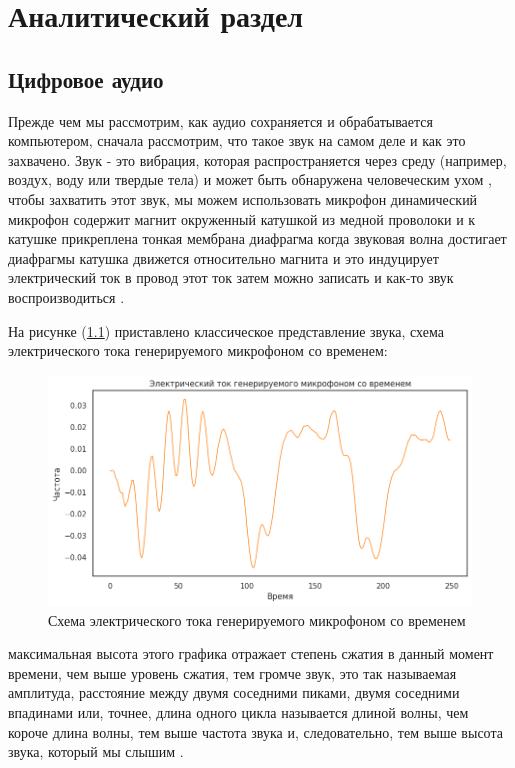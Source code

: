 \chapter{Аналитический раздел}
\section{Цифровое аудио}
Прежде чем мы рассмотрим, как аудио сохраняется и обрабатывается компьютером, сначала рассмотрим, что такое звук на самом деле и как это захвачено.
Звук - это вибрация, которая распространяется через среду (например, воздух, воду или твердые тела) и может быть обнаружена человеческим ухом \cite{pasnau1999sound}, чтобы захватить этот звук, мы можем использовать микрофон динамический микрофон содержит магнит окруженный катушкой из медной проволоки и к катушке прикреплена тонкая мембрана диафрагма когда звуковая волна достигает диафрагмы катушка движется относительно магнита и это индуцирует электрический ток в провод этот ток затем можно записать и как-то звук воспроизводиться \cite{benesty2008microphone}.

На рисунке (\ref{fig:freq_diag}) приставлено классическое представление звука, схема электрического тока генерируемого микрофоном со временем: 
\begin{figure}[H]
	\centering
	\includegraphics[width=0.8\linewidth]{images/freq_diag.png}
	\caption{Схема электрического тока генерируемого микрофоном со временем}
	\label{fig:freq_diag}
\end{figure}

максимальная высота этого графика отражает степень сжатия в данный момент времени, чем выше уровень сжатия, тем громче звук, это так называемая амплитуда, расстояние между двумя соседними пиками, двумя соседними впадинами или, точнее, длина одного цикла называется длиной волны, чем короче длина волны, тем выше частота звука и, следовательно, тем выше высота звука, который мы слышим \cite{benesty2008microphone}. 

